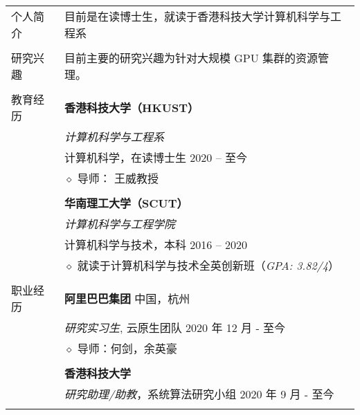 \documentclass[letterpaper, 11pt]{article}
\begin{document}
\begin{longtable}{p{1.3in}p{4.8in}}

{个人简介}
& 目前是在读博士生，就读于香港科技大学计算机科学与工程系 \\
& \\

\nohyphens{研究兴趣}
& 目前主要的研究兴趣为针对大规模 GPU 集群的资源管理。 \\
& \\

{教育经历}
& \textbf{香港科技大学（HKUST）} \\
& \textit{计算机科学与工程系} \\
& 计算机科学，在读博士生 \hfill 2020 -- 至今 \\
& $\diamond$ 导师： 王威教授 \\
& \\

& \textbf{华南理工大学（SCUT）} \\
& \textit{计算机科学与工程学院} \\
& 计算机科学与技术，本科 \hfill 2016 -- 2020 \\
& $\diamond$ 就读于计算机科学与技术全英创新班（{\it GPA: 3.82/4}） \\
& \\


{职业经历}
& {\textbf{阿里巴巴集团}} \hfill 中国，杭州 \\
& \textit{研究实习生}, 云原生团队 \hfill 2020 年 12 月 - 至今 \\
& $\diamond$ 导师：何剑，余英豪 \\
& \\

& {\textbf{香港科技大学}} \\
& \textit{研究助理/助教}，系统算法研究小组 \hfill 2020 年 9 月 - 至今 \\
& \\
 

\end{longtable}
\end{document}
